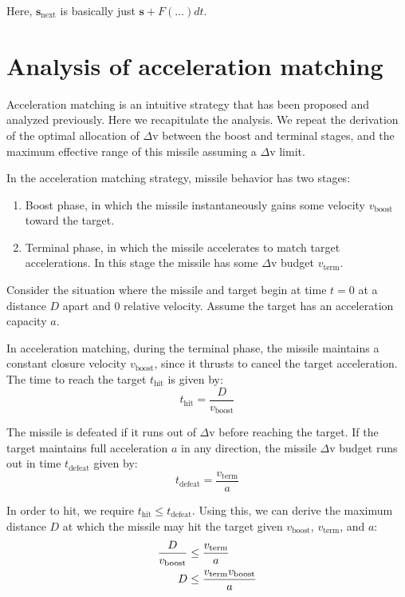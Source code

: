 \documentclass{article}
\renewcommand{\vec}[1]{\mathbf{#1}}
\begin{document}
Here, $\vec{s}_\text{next}$ is basically just $\vec{s} + F(\dots) dt$.

\section{Analysis of acceleration matching}

Acceleration matching is an intuitive strategy that has been proposed and
analyzed previously. Here we recapitulate the analysis. We repeat the derivation
of the optimal allocation of $\Delta$v between the boost and terminal stages,
and the maximum effective range of this missile assuming a $\Delta$v limit.

In the acceleration matching strategy, missile behavior has two stages:
\begin{enumerate}
\item Boost phase, in which the missile instantaneously gains some velocity
$v_\text{boost}$ toward the target.
\item Terminal phase, in which the missile accelerates to match target
accelerations. In this stage the missile has some $\Delta$v budget
$v_\text{term}$.
\end{enumerate}

Consider the situation where the missile and target begin at time $t = 0$ at a
distance $D$ apart and 0 relative velocity. Assume the target has an
acceleration capacity $a$.

In acceleration matching, during the terminal phase, the missile maintains a
constant closure velocity $v_\text{boost}$, since it thrusts to cancel the
target acceleration. The time to reach the target $t_\text{hit}$ is given by:
\begin{equation}
t_\text{hit} = \frac{D}{v_\text{boost}}
\end{equation}

The missile is defeated if it runs out of $\Delta$v before reaching the target.
If the target maintains full acceleration $a$ in any direction, the missile
$\Delta$v budget runs out in time $t_\text{defeat}$ given by:
\begin{equation}
t_\text{defeat} = \frac{v_\text{term}}{a}
\end{equation}

In order to hit, we require $t_\text{hit} \le t_\text{defeat}$. Using this, we
can derive the maximum distance $D$ at which the missile may hit the target
given $v_\text{boost}$, $v_\text{term}$, and $a$:
\begin{align}
\frac{D}{v_\text{boost}} &\le \frac{v_\text{term}}{a} \\ \notag
D &\le \frac{v_\text{term} v_\text{boost}}{a}
\end{align}
\end{document}

